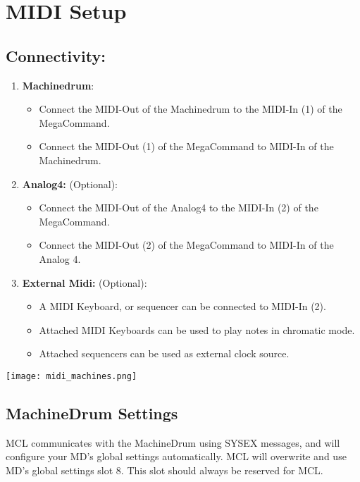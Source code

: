 \chapter{MIDI Setup}
\section{Connectivity:}

\begin{enumerate}
\item\textbf{Machinedrum}:
\begin{itemize}
    \item Connect the MIDI-Out of the Machinedrum to the MIDI-In (1) of the MegaCommand.
    \item Connect the MIDI-Out (1) of the MegaCommand to MIDI-In of the Machinedrum.
\end{itemize}

\item\textbf{Analog4:} (Optional):
\begin{itemize}
    \item Connect the MIDI-Out of the Analog4 to the MIDI-In (2) of the MegaCommand. 
    \item Connect the MIDI-Out (2) of the MegaCommand to MIDI-In of the Analog 4.
\end{itemize}

\item\textbf{External Midi:} (Optional): 
\begin{itemize}
    \item A MIDI Keyboard, or sequencer can be connected to MIDI-In (2). 
    \item Attached MIDI Keyboards can be used to play notes in chromatic mode.
    \item Attached sequencers can be used as external clock source.
\end{itemize}

\end{enumerate}
\texttt{[image: midi\_machines.png]}
\\
\newpage
\section{MachineDrum Settings }

MCL communicates with the MachineDrum using SYSEX messages, and will configure your MD's global settings automatically. MCL will overwrite and use MD's global settings slot 8. This slot should always be reserved for MCL.

